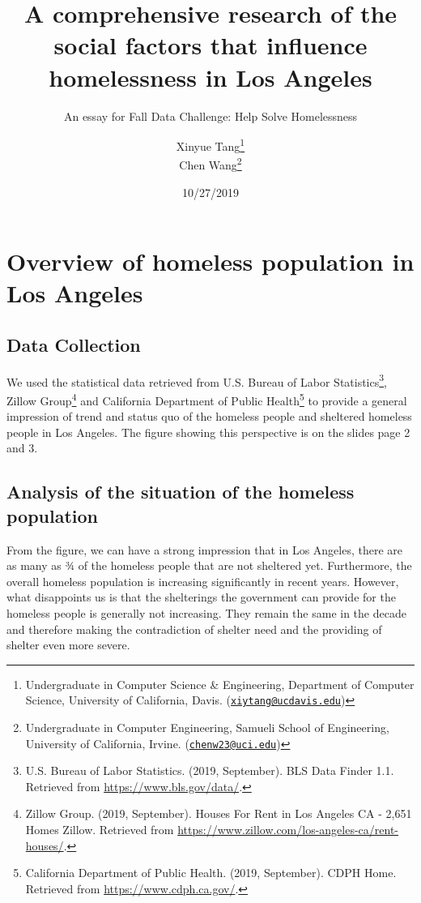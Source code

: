\documentclass[]{article}
\title{A comprehensive research of the social factors that influence
homelessness in Los Angeles}
\subtitle{An essay for Fall Data Challenge: Help Solve Homelessness}
\author{Xinyue Tang\footnote{Undergraduate in Computer Science \& Engineering,
  Department of Computer Science, University of California, Davis.
  (\href{mailto:xiytang@ucdavis.edu}{\nolinkurl{xiytang@ucdavis.edu}})} \\ Chen Wang\footnote{Undergraduate in Computer Engineering, Samueli School
  of Engineering, University of California, Irvine.
  (\href{mailto:chenw23@uci.edu}{\nolinkurl{chenw23@uci.edu}})}}
\date{10/27/2019}
\let\rmarkdownfootnote\footnote%
\def\footnote{\protect\rmarkdownfootnote}
\begin{document}
\maketitle

{
\setcounter{tocdepth}{3}
\tableofcontents
}
\newpage

\hypertarget{overview-of-homeless-population-in-los-angeles}{%
\section{Overview of homeless population in Los
Angeles}\label{overview-of-homeless-population-in-los-angeles}}

\hypertarget{data-collection}{%
\subsection{Data Collection}\label{data-collection}}

We used the statistical data retrieved from U.S. Bureau of Labor
Statistics\footnote{U.S. Bureau of Labor Statistics. (2019, September).
  BLS Data Finder 1.1. Retrieved from \url{https://www.bls.gov/data/}.},
Zillow Group\footnote{Zillow Group. (2019, September). Houses For Rent
  in Los Angeles CA - 2,651 Homes \textbar{} Zillow. Retrieved from
  \url{https://www.zillow.com/los-angeles-ca/rent-houses/}.} and
California Department of Public Health\footnote{California Department of
  Public Health. (2019, September). CDPH Home. Retrieved from
  \url{https://www.cdph.ca.gov/}.} to provide a general impression of
trend and status quo of the homeless people and sheltered homeless
people in Los Angeles. The figure showing this perspective is on the
slides page 2 and 3.

\hypertarget{analysis-of-the-situation-of-the-homeless-population}{%
\subsection{Analysis of the situation of the homeless
population}\label{analysis-of-the-situation-of-the-homeless-population}}

From the figure, we can have a strong impression that in Los Angeles,
there are as many as ¾ of the homeless people that are not sheltered
yet. Furthermore, the overall homeless population is increasing
significantly in recent years. However, what disappoints us is that the
shelterings the government can provide for the homeless people is
generally not increasing. They remain the same in the decade and
therefore making the contradiction of shelter need and the providing of
shelter even more severe.
\end{document}
